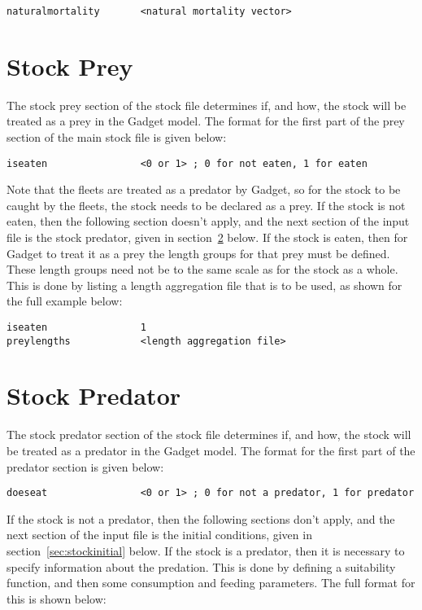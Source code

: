 \documentclass [a4paper, 10pt]{book}
\begin{document}
{\small\begin{verbatim}
naturalmortality       <natural mortality vector>
\end{verbatim}}

\section{Stock Prey}\label{sec:stockprey}
The stock prey section of the stock file determines if, and how, the stock will be treated as a prey in the Gadget model.  The format for the first part of the prey section of the main stock file is given below:

{\small\begin{verbatim}
iseaten                <0 or 1> ; 0 for not eaten, 1 for eaten
\end{verbatim}}

Note that the fleets are treated as a predator by Gadget, so for the stock to be caught by the fleets, the stock needs to be declared as a prey.  If the stock is not eaten, then the following section doesn't apply, and the next section of the input file is the stock predator, given in section~\ref{sec:stockpredator} below.  If the stock is eaten, then for Gadget to treat it as a prey the length groups for that prey must be defined.  These length groups need not be to the same scale as for the stock as a whole.  This is done by listing a length aggregation file that is to be used, as shown for the full example below:

{\small\begin{verbatim}
iseaten                1
preylengths            <length aggregation file>
\end{verbatim}}

\section{Stock Predator}\label{sec:stockpredator}
The stock predator section of the stock file determines if, and how, the stock will be treated as a predator in the Gadget model.  The format for the first part of the predator section is given below:

{\small\begin{verbatim}
doeseat                <0 or 1> ; 0 for not a predator, 1 for predator
\end{verbatim}}

If the stock is not a predator, then the following sections don't apply, and the next section of the input file is the initial conditions, given in section~\ref{sec:stockinitial} below.  If the stock is a predator, then it is necessary to specify information about the predation.  This is done by defining a suitability function, and then some consumption and feeding parameters.  The full format for this is shown below:
\end{document}
